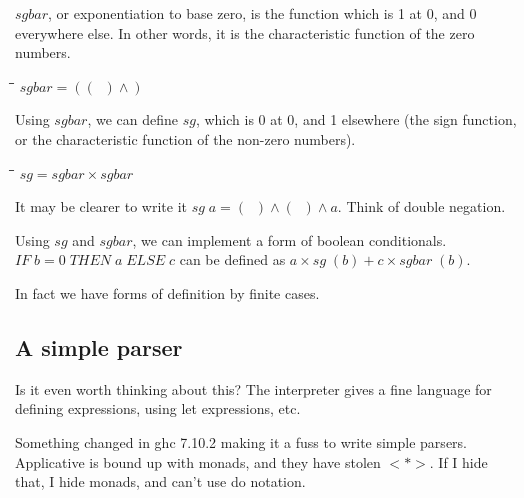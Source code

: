 \documentclass{article}
\newlength{\lwidth}\setlength{\lwidth}{4.5cm}
\newlength{\cwidth}\setlength{\cwidth}{8mm} %
\newcommand{\Conid}[1]{\mathit{#1}}
\newcommand{\Varid}[1]{\mathit{#1}}
\begin{document}
\ensuremath{\Varid{sgbar}}, or exponentiation to base zero, is the function which is 1 at
0, and 0 everywhere else.  In other words, it is the characteristic
function of the zero numbers.  
\begin{tabbing}
\qquad\=\hspace{\lwidth}\=\hspace{\cwidth}\=\+\kill
${\Varid{sgbar}\mathrel{=}((\!\mathop{{}^{{}^{\cdot}}}\!)\wedge)}$
\end{tabbing}
Using \ensuremath{\Varid{sgbar}}, we can define \ensuremath{\Varid{sg}}, which is 0
at 0, and 1 elsewhere (the sign function, or the characteristic
function of the non-zero numbers).
\begin{tabbing}
\qquad\=\hspace{\lwidth}\=\hspace{\cwidth}\=\+\kill
${\Varid{sg}\mathrel{=}\Varid{sgbar}\times\Varid{sgbar}}$
\end{tabbing}It may be clearer to write it \ensuremath{\Varid{sg}\;\Varid{a}\mathrel{=}(\!\mathop{{}^{{}^{\cdot}}}\!)\wedge(\!\mathop{{}^{{}^{\cdot}}}\!)\wedge\Varid{a}}.  Think of double negation. 

Using \ensuremath{\Varid{sg}} and \ensuremath{\Varid{sgbar}}, we can implement a form of boolean
conditionals.  \ensuremath{\Conid{IF}\;\Varid{b}\mathrel{=}\mathrm{0}\;\Conid{THEN}\;\Varid{a}\;\Conid{ELSE}\;\Varid{c}} 
can be defined as \ensuremath{\Varid{a}\times\Varid{sg}\;(\Varid{b})\mathbin{+}\Varid{c}\times\Varid{sgbar}\;(\Varid{b})}.  

In fact we have forms of definition by finite cases.


\iffalse
\subsection{A simple parser}

Is it even worth thinking about this?  The interpreter gives a
fine language for defining expressions, using let expressions, etc.

Something changed in ghc 7.10.2 making it a fuss to write simple parsers.
Applicative is bound up with monads, and they have stolen \ensuremath{\mathbin{<*>}}. If
I hide that, I hide monads, and can't use do notation. 
\end{document}
